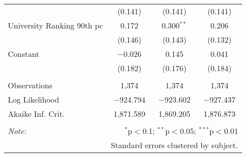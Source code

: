 \begin{table}[!htbp]
\begin{tabular}{@{\extracolsep{5pt}}lccc}
  & (0.141) & (0.141) & (0.141) \\ 
  University Ranking 90th pc & 0.172 & 0.300$^{**}$ & 0.206 \\ 
  & (0.146) & (0.143) & (0.132) \\ 
  Constant & $-$0.026 & 0.145 & 0.041 \\ 
  & (0.182) & (0.176) & (0.184) \\ 
 \hline \\[-1.8ex] 
Observations & 1,374 & 1,374 & 1,374 \\ 
Log Likelihood & $-$924.794 & $-$923.602 & $-$927.437 \\ 
Akaike Inf. Crit. & 1,871.589 & 1,869.205 & 1,876.873 \\ 
\hline 
\hline \\[-1.8ex] 
\textit{Note:}  & \multicolumn{3}{r}{$^{*}$p$<$0.1; $^{**}$p$<$0.05; $^{***}$p$<$0.01} \\ 
 & \multicolumn{3}{r}{Standard errors clustered by subject.} \\ 
\end{tabular} 
\end{table} 
